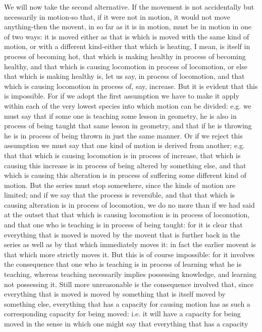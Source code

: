 We will now take the second alternative. If the movement is not accidentally
but necessarily in motion-so that, if it were not in motion, it would
not move anything-then the movent, in so far as it is in motion, must
be in motion in one of two ways: it is moved either as that is which
is moved with the same kind of motion, or with a different kind-either
that which is heating, I mean, is itself in process of becoming hot,
that which is making healthy in process of becoming healthy, and that
which is causing locomotion in process of locomotion, or else that
which is making healthy is, let us say, in process of locomotion,
and that which is causing locomotion in process of, say, increase.
But it is evident that this is impossible. For if we adopt the first
assumption we have to make it apply within each of the very lowest
species into which motion can be divided: e.g. we must say that if
some one is teaching some lesson in geometry, he is also in process
of being taught that same lesson in geometry, and that if he is throwing
he is in process of being thrown in just the same manner. Or if we
reject this assumption we must say that one kind of motion is derived
from another; e.g. that that which is causing locomotion is in process
of increase, that which is causing this increase is in process of
being altered by something else, and that which is causing this alteration
is in process of suffering some different kind of motion. But the
series must stop somewhere, since the kinds of motion are limited;
and if we say that the process is reversible, and that that which
is causing alteration is in process of locomotion, we do no more than
if we had said at the outset that that which is causing locomotion
is in process of locomotion, and that one who is teaching is in process
of being taught: for it is clear that everything that is moved is
moved by the movent that is further back in the series as well as
by that which immediately moves it: in fact the earlier movent is
that which more strictly moves it. But this is of course impossible:
for it involves the consequence that one who is teaching is in process
of learning what he is teaching, whereas teaching necessarily implies
possessing knowledge, and learning not possessing it. Still more unreasonable
is the consequence involved that, since everything that is moved is
moved by something that is itself moved by something else, everything
that has a capacity for causing motion has as such a corresponding
capacity for being moved: i.e. it will have a capacity for being moved
in the sense in which one might say that everything that has a capacity
